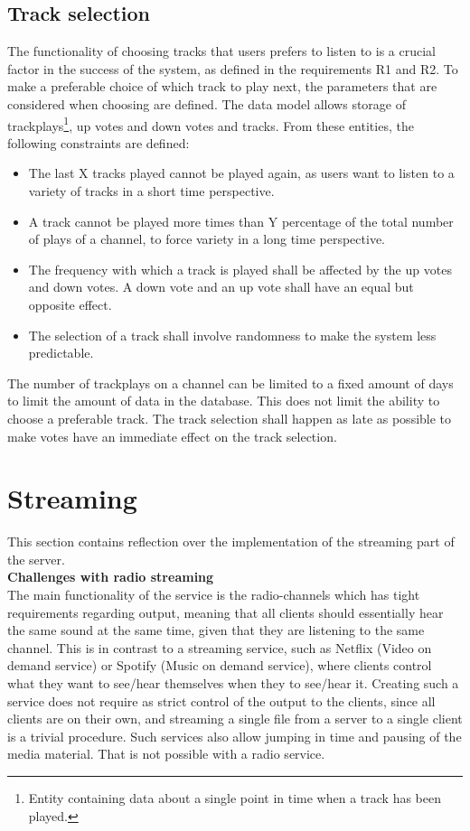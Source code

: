 \documentclass[a4paper,11pt,report]{article}
\begin{document}
\subsection{Track selection}
The functionality of choosing tracks that users prefers to listen to is a crucial factor in the success of the system, as defined in the requirements R1 and R2. To make a preferable choice of which track to play next, the parameters that are considered when choosing are defined. The data model allows storage of trackplays\footnote{Entity containing data about a single point in time when a track has been played.}, up votes and down votes and tracks. From these entities, the following constraints are defined:
\begin{itemize}
\item The last X tracks played cannot be played again, as users want to listen to a variety of tracks in a short time perspective.
\item A track cannot be played more times than Y percentage of the total number of plays of a channel, to force variety in a long time perspective.
\item The frequency with which a track is played shall be affected by the up votes and down votes. A down vote and an up vote shall have an equal but opposite effect.
\item The selection of a track shall involve randomness to make the system less predictable.
\end{itemize}
The number of trackplays on a channel can be limited to a fixed amount of days to limit the amount of data in the database. This does not limit the ability to choose a preferable track. The track selection shall happen as late as possible to make votes have an immediate effect on the track selection. 

\section{Streaming}
This section contains reflection over the implementation of the streaming part of the server. \\

\textbf{Challenges with radio streaming} \\
The main functionality of the service is the radio-channels which has tight requirements regarding output, meaning that all clients should essentially hear the same sound at the same time, given that they are listening to the same channel.
This is in contrast to a streaming service, such as Netflix (Video on demand service) or Spotify (Music on demand service), where clients control what they want to see/hear themselves when they to see/hear it. Creating such a service does not require as strict control of the output to the clients, since all clients are on their own, and streaming a single file from a server to a single client is a trivial procedure. Such services also allow jumping in time and pausing of the media material. That is not possible with a radio service.\\
\end{document}
